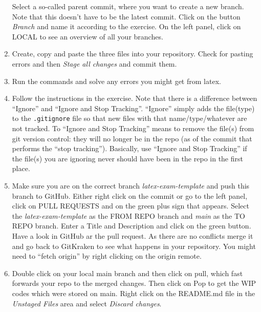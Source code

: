 \begin{enumerate}
Select a so-called parent commit, where you want to create a new branch.
Note that this doesn't have to be the latest commit.
Click on the button \emph{Branch} and name it according to the exercise.
On the left panel, click on LOCAL to see an overview of all your branches.

\item
Create, copy and paste the three files into your repository.
Check for pasting errors and then \emph{Stage all changes} and commit them.

\item
Run the commands and solve any errors you might get from latex.

\item
Follow the instructions in the exercise.
Note that there is a difference between \enquote{Ignore} and \enquote{Ignore and Stop Tracking}.
\enquote{Ignore} simply adds the file{(type)} to the \texttt{.gitignore} file so that new files with that name/type/whatever are not tracked.
To \enquote{Ignore and Stop Tracking} means to remove the file{(s)} from git version control:
  they will no longer be in the repo (as of the commit that performs the \enquote{stop tracking}).
Basically, use \enquote{Ignore and Stop Tracking} if the file{(s)} you are ignoring never should have been in the repo in the first place.

\item
Make sure you are on the correct branch \emph{latex-exam-template} and push this branch to GitHub.
Either right click on the commit or go to the left panel, click on PULL REQUESTS and on the green plus sign that appears.
Select the \emph{latex-exam-template} as the FROM REPO branch and \emph{main} as the TO REPO branch.
Enter a Title and Description and click on the green button.
Have a look in GitHub ar the pull request.
As there are no conflicts merge it and go back to GitKraken to see what happens in your repository.
You might need to \enquote{fetch origin} by right clicking on the origin remote.

\item
Double click on your local main branch and then click on pull,
  which fast forwards your repo to the merged changes.
Then click on Pop to get the WIP codes which were stored on main.
Right click on the README.md file in the \emph{Unstaged Files} area and select \emph{Discard changes}.

\end{enumerate}
